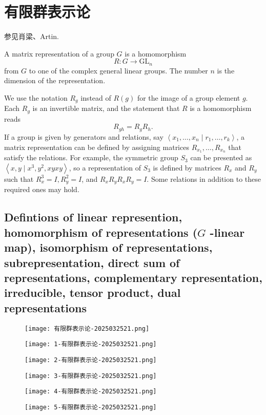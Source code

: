 \section{有限群表示论}

参见肖梁、Artin.

A matrix representation of a group $G$ is a homomorphism
\[
R:G\to \mathrm{GL}_{n}
\]
from $G$ to one of the complex general linear groups. The number $n$ is the dimension of the representation.

We use the notation $R_g$ instead of $R(g)$ for the image of a group element $g$. Each $R_g$ is an invertible matrix, and the statement that $R$ is a homomorphism reads
\[
R_{g h}=R_g R_h .
\]
If a group is given by generators and relations, say $\left\langle x_1, \ldots, x_n \mid r_1, \ldots, r_k\right\rangle$, a matrix representation can be defined by assigning matrices $R_{x_1}, \ldots, R_{x_n}$ that satisfy the relations. For example, the symmetric group $S_3$ can be presented as $\left\langle x, y \mid x^3, y^2, x y x y\right\rangle$, so a representation of $S_3$ is defined by matrices $R_x$ and $R_y$ such that $R_x^3=I, R_y^2=I$, and $R_x R_y R_x R_y=I$. Some relations in addition to these required ones may hold.

\subsection{Defintions of linear represention, homomorphism of representations (\texorpdfstring{$G$}{G} -linear map), isomorphism of representations, subrepresentation, direct sum of representations, complementary representation, irreducible, tensor product, dual representations}

\begin{figure}[H]
\centering
\texttt{[image: 有限群表示论-2025032521.png]}
\label{}
\end{figure}
\begin{figure}[H]
\centering
\texttt{[image: 1-有限群表示论-2025032521.png]}
\label{}
\end{figure}
\begin{figure}[H]
\centering
\texttt{[image: 2-有限群表示论-2025032521.png]}
\label{}
\end{figure}
\begin{figure}[H]
\centering
\texttt{[image: 3-有限群表示论-2025032521.png]}
\label{}
\end{figure}
\begin{figure}[H]
\centering
\texttt{[image: 4-有限群表示论-2025032521.png]}
\label{}
\end{figure}
\begin{figure}[H]
\centering
\texttt{[image: 5-有限群表示论-2025032521.png]}
\label{}
\end{figure}

